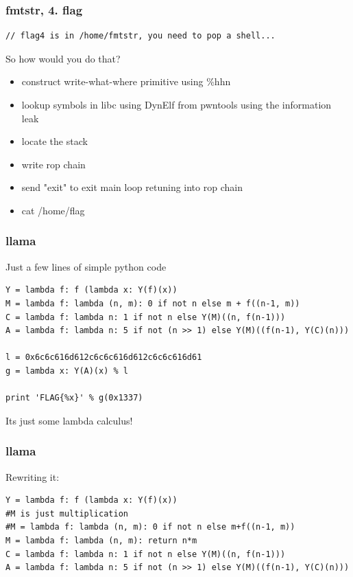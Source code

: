 \documentclass{beamer}
\begin{document}
\begin{frame}[fragile]
    \frametitle{fmtstr, 4. flag}
    \begin{lstlisting}[style=custompy]
// flag4 is in /home/fmtstr, you need to pop a shell...
    \end{lstlisting}

    \pause
    
    So how would you do that?

    \begin{itemize}
        \pause \item construct write-what-where primitive using \%hhn
        \pause \item lookup symbols in libc using DynElf from pwntools using the information leak
        \pause \item locate the stack
        \pause \item write rop chain
        \pause \item send "exit" to exit main loop retuning into rop chain
        \pause \item cat /home/flag
    \end{itemize}
\end{frame}

\begin{frame}[fragile]
    \frametitle{llama}
    
    Just a few lines of simple python code

    \begin{lstlisting}[style=custompy]
Y = lambda f: f (lambda x: Y(f)(x))
M = lambda f: lambda (n, m): 0 if not n else m + f((n-1, m))
C = lambda f: lambda n: 1 if not n else Y(M)((n, f(n-1)))
A = lambda f: lambda n: 5 if not (n >> 1) else Y(M)((f(n-1), Y(C)(n)))

l = 0x6c6c616d612c6c6c616d612c6c6c616d61
g = lambda x: Y(A)(x) % l

print 'FLAG{%x}' % g(0x1337)
    \end{lstlisting}

    \pause
    
    Its just some lambda calculus!
\end{frame}

\begin{frame}[fragile]
    \frametitle{llama}

    Rewriting it:

    \begin{lstlisting}[style=custompy]
Y = lambda f: f (lambda x: Y(f)(x))
#M is just multiplication
#M = lambda f: lambda (n, m): 0 if not n else m+f((n-1, m))
M = lambda f: lambda (n, m): return n*m
C = lambda f: lambda n: 1 if not n else Y(M)((n, f(n-1)))
A = lambda f: lambda n: 5 if not (n >> 1) else Y(M)((f(n-1), Y(C)(n)))
    \end{lstlisting}
\end{frame}
\end{document}
